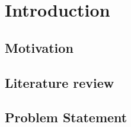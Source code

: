 \chapter{Introduction}
\label{sec:introduction}
\section{Motivation}
\label{sec:motivation}
\section{Literature review}
\label{sec:literature_review}

\citep{brescianini_design_2016}
\citep{nikou_mechanical_2015}
\citep{kamel_voliro:_2018}
\citep{tognon_omnidirectional_2018}
\citep{rajappa_modeling_2015}
\citep{rashad_design_2017}
\citep{park_design_2016}
\citep{ryll_modeling_2012}
\citep{burri_maximum_2016}

\section{Problem Statement}
\label{sec:problem_statement}
